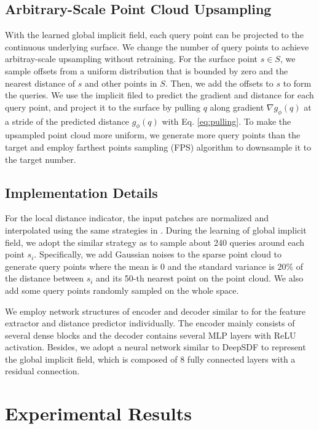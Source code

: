\documentclass[letterpaper]{article} %
\begin{document}
\subsection{Arbitrary-Scale Point Cloud Upsampling}
With the learned global implicit field, each query point can be projected to the continuous underlying surface. We change the number of query points to achieve arbitray-scale upsampling without retraining. For the surface point $s \in S$, we sample offsets from a uniform distribution that is bounded by zero and the nearest distance of $s$ and other points in $S$. Then, we add the offsets to $s$ to form the queries. We use the implicit filed to predict the gradient and distance for each query point, and project it to the surface by pulling $q$ along gradient $\nabla{g_\phi(q)}$ at a stride of the predicted distance $g_\phi(q)$ with Eq. \ref{eq:pulling}. To make the upsampled point cloud more uniform, we generate more query points than the target and employ farthest points sampling (FPS) \cite{eldar1997farthest} algorithm to downsample it to the target number.


\subsection{Implementation Details}
For the local distance indicator, the input patches are normalized and interpolated using the same strategies in \cite{he2023grad}. During the learning of global implicit field, we adopt the similar strategy as \cite{zhou2022learning} to sample about 240 queries around each point $s_i$. Specifically, we add Gaussian noises to the sparse point cloud to generate query points where the mean is $0$ and the standard variance is $20\%$ of the distance between $s_i$ and its 50-th nearest point on the point cloud. We also add some query points randomly sampled on the whole space.

We employ network structures of encoder and decoder similar to \cite{he2023grad} for the feature extractor and distance predictor individually. The encoder mainly consists of several dense blocks \cite{huang2017densely} and the decoder contains several MLP layers with ReLU activation. Besides, we adopt a neural network
similar to DeepSDF \cite{park2019deepsdf} to represent the global implicit field, which is composed of 8 fully connected layers with a residual connection.

\section{Experimental Results}
\end{document}
